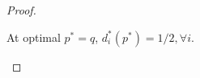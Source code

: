 \begin{proof}
\begin{itemize}
At optimal $p^*=q$, $d_i^*(p^*)=1/2,\forall i$.
\end{itemize}
%
\end{proof}

